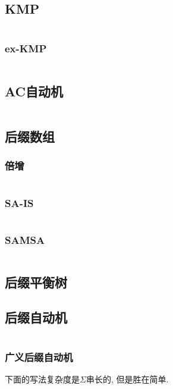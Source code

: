 \documentclass[a4paper, twoside]{article}
\begin{document}
\begin{multicols}{2}
			\subsection{KMP}
				\inputminted{cpp}{../src/string/KMP.cpp}
				
				\subsubsection{ex-KMP}
					\inputminted{cpp}{../src/string/exKMP.cpp}

			\subsection{AC自动机}
				\inputminted{cpp}{../src/string/AC自动机.cpp}

			\subsection{后缀数组}
				\subsubsection{倍增}
					\inputminted{cpp}{../src/string/sa.cpp}	

				\subsubsection{SA-IS}
					\inputminted{cpp}{../src/string/sais.cpp}
			
				\subsubsection{SAMSA}
				 	\inputminted{cpp}{../src/string/SAMSA.cpp}

			\subsection{后缀平衡树}
				

			\subsection{后缀自动机}
				\inputminted{cpp}{../src/string/后缀自动机.cpp}

				\subsubsection{广义后缀自动机}
				下面的写法复杂度是$\Sigma$串长的, 但是胜在简单.
				

\end{multicols}
\end{document}
